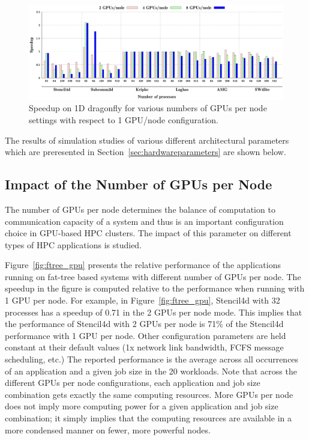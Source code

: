 \begin{figure}[t]
\centering
\includegraphics[width=\textwidth]{plots/dfly/map/dfly-mapping-all.eps}
\caption{Speedup on 1D dragonfly for various numbers of GPUs per node settings with
respect to 1 GPU/node configuration.}
\label{fig:dfly_gpu}
\end{figure}


The results of simulation studies of various
different architectural parameters which are preresented in
Section~\ref{sec:hardwareparameters} are shown below.

\subsection{Impact of the Number of GPUs per Node}

The number of GPUs per node determines the balance of computation 
to communication capacity of a system and thus is an important configuration
choice in GPU-based HPC clusters.
The impact of this parameter on different types of HPC applications is studied.

Figure~\ref{fig:ftree_gpu} presents the relative performance of the applications
running on fat-tree based systems with different number of GPUs per node.  The
speedup in the figure is computed relative to the performance when running with 1 GPU per node.
For example, in Figure~\ref{fig:ftree_gpu}, Stencil4d with 32 processes has a
speedup of 0.71 in the 2 GPUs per node mode. This implies that the performance
of Stencil4d with 2 GPUs per node is 71\% of the Stencil4d performance with 1 GPU
per node.  Other configuration parameters are held constant at their default
values (1x network link bandwidth, FCFS message scheduling, etc.) The
reported performance is the average across all occurrences of an application
and a given job size in the 20 workloads. Note that across the different GPUs per node
configurations, each application and job size combination gets exactly the same computing
resources. More GPUs per node does not imply more computing power for a given
application and job size combination; it simply implies that the computing resources are
available in a more condensed manner on fewer, more powerful nodes.

